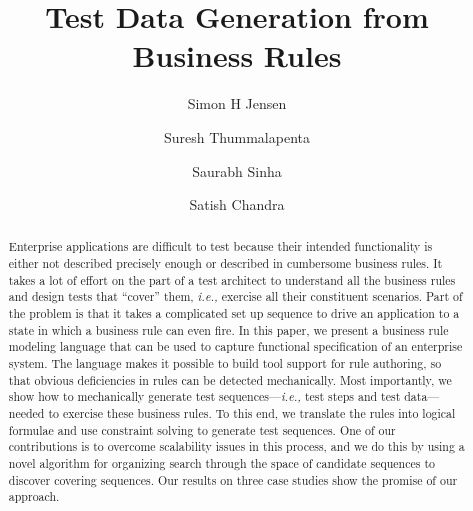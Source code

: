 \documentclass{sig-alternate}
\begin{document}
\newcommand{\ie}{\textit{i.e.,} }
\newcommand{\eg}{\textit{e.g.,} }
\newcommand{\subject}[1]{\texttt{\small #1}}
\newcommand{\rules}{{\mathcal R}}
\newcommand{\tests}{{\mathcal T}}
\newcommand{\elemexists}{\mt{exists}}
\newcommand{\elemenabled}{\mt{enabled}}
\newcommand{\elemexplored}{\mt{explored}}
\newcommand{\note}[1]{{\color{red}$[$ \bf #1 $]$}}
\newcommand{\lang}[1]{\texttt{\scriptsize #1}}

\title{Test Data Generation from Business Rules}

\author{Simon H Jensen \and Suresh Thummalapenta \and Saurabh Sinha \and Satish Chandra}

\maketitle

\begin{abstract}
Enterprise applications are difficult to test because their intended
functionality is either not described precisely enough or described in
cumbersome business rules. It takes a lot of effort on the part of a test
architect to understand all the business rules and design tests that ``cover''
them, \ie exercise all their constituent scenarios. Part of the problem is that
it takes a complicated set up sequence to drive an application to a state in
which a business rule can even fire.  In this paper, we present a business rule
modeling language that can be used to capture functional specification of an
enterprise system. The language makes it possible to build tool support for rule
authoring, so that obvious deficiencies in rules can be detected
mechanically. Most importantly, we show how to mechanically generate test
sequences---\ie test steps and test data---needed to exercise these business
rules. To this end, we translate the rules into logical formulae and use
constraint solving to generate test sequences.  One of our contributions is to
overcome scalability issues in this process, and we do this by using a novel
algorithm for organizing search through the space of candidate sequences to
discover covering sequences.  Our results on three case studies show the promise
of our approach.
\end{abstract}










\end{document}
